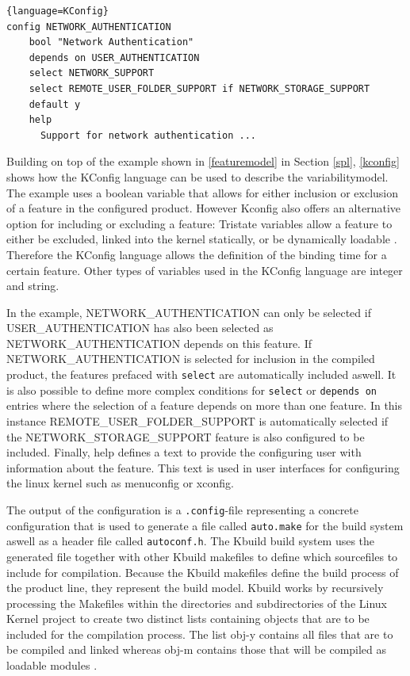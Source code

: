 \documentclass[a4paper]{article}
\begin{document}
\begin{lstlisting}[caption= KConfig Language, label=kconfig]{language=KConfig}
config NETWORK_AUTHENTICATION
	bool "Network Authentication"
	depends on USER_AUTHENTICATION
	select NETWORK_SUPPORT
	select REMOTE_USER_FOLDER_SUPPORT if NETWORK_STORAGE_SUPPORT
	default y
	help
	  Support for network authentication ...
\end{lstlisting}
 
Building on top of the example shown in \autoref{featuremodel} in Section \ref{spl}, \autoref{kconfig} shows how the KConfig language can be used to describe the variabilitymodel. The example uses a boolean variable that allows for either inclusion or exclusion of a feature in the configured product. However Kconfig also offers an alternative option for including or excluding a feature: Tristate variables allow a feature to either be excluded, linked into the kernel statically, or be dynamically loadable \cite{variabilitymodel-linux}. Therefore the KConfig language allows the definition of the binding time for a certain feature. Other types of variables used in the KConfig language are integer and string.

In the example, NETWORK\_AUTHENTICATION can only be selected if USER\_AUTHENTICATION has also been selected as NETWORK\_AUTHENTICATION depends on this feature. If NETWORK\_AUTHENTICATION is selected for inclusion in the compiled product, the features prefaced with \texttt{select} are automatically included aswell. It is also possible to define more complex conditions for \texttt{select} or \texttt{depends on} entries where the selection of a feature depends on more than one feature. In this instance REMOTE\_USER\_FOLDER\_SUPPORT is automatically selected if the NETWORK\_STORAGE\_SUPPORT feature is also configured to be included. Finally, help defines a text to provide the configuring user with information about the feature. This text is used in user interfaces for configuring the linux kernel such as menuconfig or xconfig.

The output of the configuration is a \texttt{.config}-file representing a concrete configuration that is used to generate a file called \texttt{auto.make} for the build system aswell as a header file called \texttt{autoconf.h}. The Kbuild build system uses the generated file together with other Kbuild makefiles to define which sourcefiles to include for compilation. Because the Kbuild makefiles define the build process of the product line, they represent the build model. Kbuild works by recursively processing the Makefiles within the directories and subdirectories of the Linux Kernel project to create two distinct lists containing objects that are to be included for the compilation process. The list obj-y contains all files that are to be compiled and linked whereas  obj-m contains those that will be compiled as loadable modules \cite{nadi-linux-kernel}\cite{makefiles.txt}. 
\end{document}
